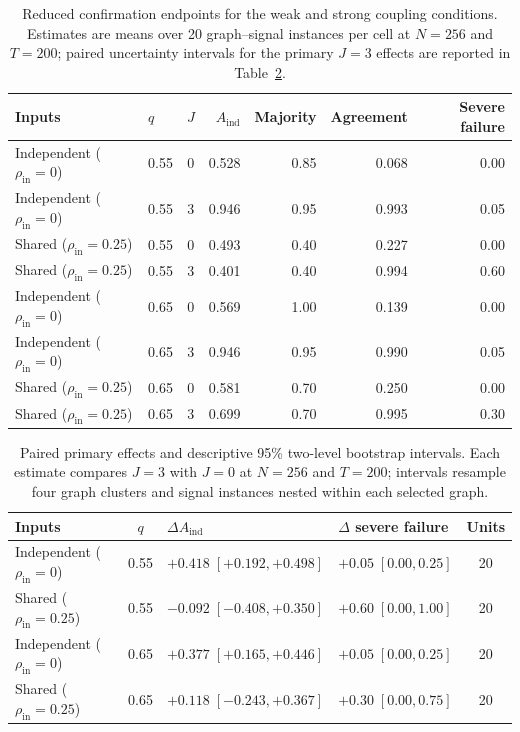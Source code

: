 \documentclass[11pt,a4paper]{article}
\begin{document}
\begin{table}[htbp]
\centering
\caption{Reduced confirmation endpoints for the weak and strong coupling conditions. Estimates are means over 20 graph--signal instances per cell at $N=256$ and $T=200$; paired uncertainty intervals for the primary $J=3$ effects are reported in Table~\ref{tab:primaryuncertainty}.}
\label{tab:mainresults}
\small
\begin{tabular}{@{}llcrrrr@{}}
\toprule
Inputs & $q$ & $J$ & $A_{\mathrm{ind}}$ & Majority & Agreement & Severe failure \\
\midrule
Independent ($\rho_{\mathrm{in}}=0$) & 0.55 & 0 & 0.528 & 0.85 & 0.068 & 0.00 \\
Independent ($\rho_{\mathrm{in}}=0$) & 0.55 & 3 & 0.946 & 0.95 & 0.993 & 0.05 \\
Shared ($\rho_{\mathrm{in}}=0.25$) & 0.55 & 0 & 0.493 & 0.40 & 0.227 & 0.00 \\
Shared ($\rho_{\mathrm{in}}=0.25$) & 0.55 & 3 & 0.401 & 0.40 & 0.994 & 0.60 \\
Independent ($\rho_{\mathrm{in}}=0$) & 0.65 & 0 & 0.569 & 1.00 & 0.139 & 0.00 \\
Independent ($\rho_{\mathrm{in}}=0$) & 0.65 & 3 & 0.946 & 0.95 & 0.990 & 0.05 \\
Shared ($\rho_{\mathrm{in}}=0.25$) & 0.65 & 0 & 0.581 & 0.70 & 0.250 & 0.00 \\
Shared ($\rho_{\mathrm{in}}=0.25$) & 0.65 & 3 & 0.699 & 0.70 & 0.995 & 0.30 \\
\bottomrule
\end{tabular}
\end{table}

\begin{table}[htbp]
\centering
\caption{Paired primary effects and descriptive 95\% two-level bootstrap intervals. Each estimate compares $J=3$ with $J=0$ at $N=256$ and $T=200$; intervals resample four graph clusters and signal instances nested within each selected graph.}
\label{tab:primaryuncertainty}
\small
\begin{tabularx}{\textwidth}{@{}X c X X c@{}}
\toprule
Inputs & $q$ & $\Delta A_{\mathrm{ind}}$ & $\Delta$ severe failure & Units \\
\midrule
Independent ($\rho_{\mathrm{in}}=0$) & 0.55 & $+0.418\;[+0.192,+0.498]$ & $+0.05\;[0.00,0.25]$ & 20 \\
Shared ($\rho_{\mathrm{in}}=0.25$) & 0.55 & $-0.092\;[-0.408,+0.350]$ & $+0.60\;[0.00,1.00]$ & 20 \\
Independent ($\rho_{\mathrm{in}}=0$) & 0.65 & $+0.377\;[+0.165,+0.446]$ & $+0.05\;[0.00,0.25]$ & 20 \\
Shared ($\rho_{\mathrm{in}}=0.25$) & 0.65 & $+0.118\;[-0.243,+0.367]$ & $+0.30\;[0.00,0.75]$ & 20 \\
\bottomrule
\end{tabularx}
\end{table}
\end{document}
